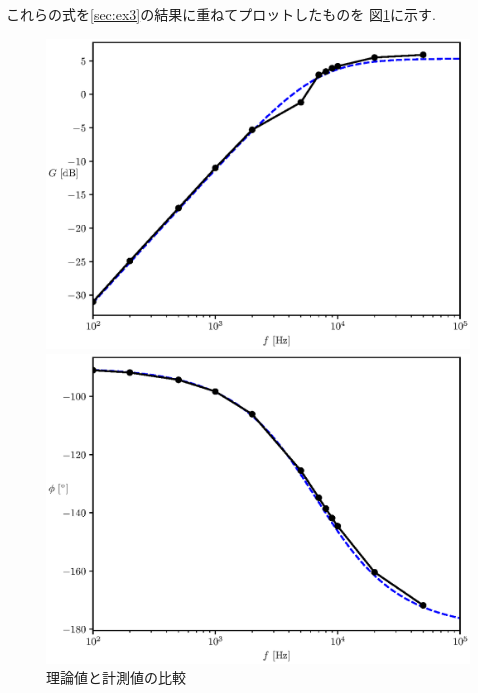 \documentclass[titlepage]{jsarticle}
\begin{document}
            これらの式を\ref{sec:ex3}の結果に重ねてプロットしたものを
            図\ref{fig:difex2}に示す.

            \begin{figure}[h]
                \begin{minipage}{0.5\hsize}
                    \centering
                    \includegraphics[width=1.1\hsize]{img/ex2-1.eps}
                \end{minipage}
                \begin{minipage}{0.5\hsize}
                    \centering
                    \includegraphics[width=1.1\hsize]{img/ex2-2.eps}
                \end{minipage}
                \caption{理論値と計測値の比較}
                \label{fig:difex2}
            \end{figure}
            
\end{document}
